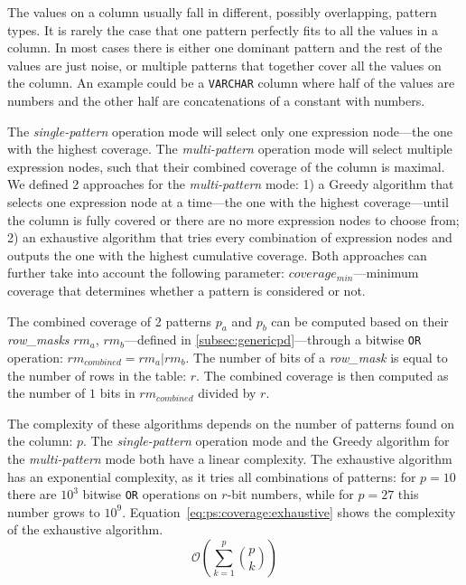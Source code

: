 The values on a column usually fall in different, possibly overlapping, pattern types. It is rarely the case that one pattern perfectly fits to all the values in a column. In most cases there is either one dominant pattern and the rest of the values are just noise, or multiple patterns that together cover all the values on the column. An example could be a \verb|VARCHAR| column where half of the values are numbers and the other half are concatenations of a constant with numbers.

The \textit{single-pattern} operation mode will select only one expression node---the one with the highest coverage. The \textit{multi-pattern} operation mode will select multiple expression nodes, such that their combined coverage of the column is maximal. We defined 2 approaches for the \textit{multi-pattern} mode: 1) a Greedy algorithm that selects one expression node at a time---the one with the highest coverage---until the column is fully covered or there are no more expression nodes to choose from; 2) an exhaustive algorithm that tries every combination of expression nodes and outputs the one with the highest cumulative coverage. Both approaches can further take into account the following parameter: \(coverage_{min}\)---minimum coverage that determines whether a pattern is considered or not.

The combined coverage of 2 patterns \(p_{a}\) and \(p_{b}\) can be computed based on their \textit{row\_masks} \(\mathit{rm}_{a}\), \(\mathit{rm}_{b}\)---defined in \ref{subsec:genericpd}---through a bitwise \verb|OR| operation: \(\mathit{rm}_{combined} = \mathit{rm}_{a} | \mathit{rm}_{b}\). The number of bits of a \textit{row\_mask} is equal to the number of rows in the table: \(r\). The combined coverage is then computed as the number of \(1\) bits in \(\mathit{rm}_{combined}\) divided by \(r\).

The complexity of these algorithms depends on the number of patterns found on the column: \(p\). The \textit{single-pattern} operation mode and the Greedy algorithm for the \textit{multi-pattern} mode both have a linear complexity. The exhaustive algorithm has an exponential complexity, as it tries all combinations of patterns: for \(p = 10\) there are \(10^3\) bitwise \verb|OR| operations on \(r\)-bit numbers, while for \(p = 27\) this number grows to \(10^9\). Equation~\ref{eq:ps:coverage:exhaustive} shows the complexity of the exhaustive algorithm.
\begin{equation}
\label{eq:ps:coverage:exhaustive}
    \mathcal{O}(\sum_{k=1}^{p} {p \choose k})
\end{equation}

